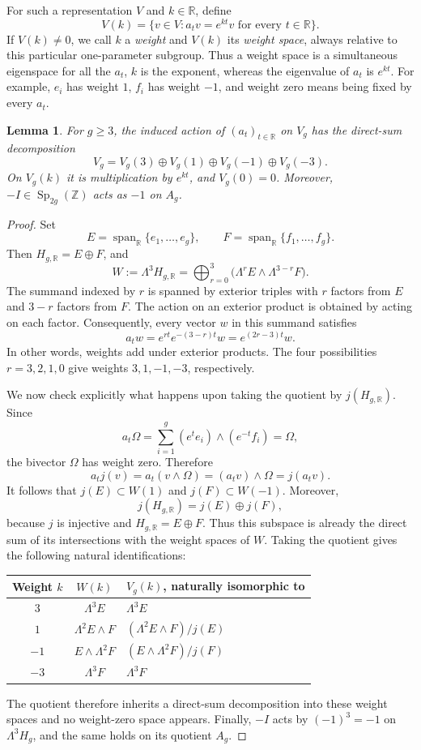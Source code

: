\documentclass[11pt,a4paper]{article}
\newtheorem{lemma}[theorem]{Lemma}
\theoremstyle{definition}
\newcommand{\R}{\mathbb R}
\newcommand{\Z}{\mathbb Z}
\newcommand{\Sp}{\operatorname{Sp}}
\begin{document}
For such a representation \(V\) and \(k\in\R\), define
\[
 V(k)=\{v\in V:a_t v=e^{kt}v\text{ for every }t\in\R\}.
\]
If \(V(k)\ne0\), we call \(k\) a \emph{weight} and \(V(k)\)
its \emph{weight space}, always relative to this particular
one-parameter subgroup. Thus a weight space is a simultaneous
eigenspace for all the \(a_t\),  \(k\) is the exponent, whereas
the eigenvalue of \(a_t\) is \(e^{kt}\). For example, \(e_i\)
has weight \(1\), \(f_i\) has weight \(-1\), and weight zero
means being fixed by every \(a_t\).


\begin{lemma}
\label{lem:weights}
For \(g\ge3\), the induced action of \((a_t)_{t\in\R}\)
on \(V_g\) has the direct-sum decomposition
\[
 V_g=V_g(3)\oplus V_g(1)\oplus V_g(-1)\oplus V_g(-3).
\]
On \(V_g(k)\) it is multiplication by \(e^{kt}\), and
\(V_g(0)=0\). Moreover,
\(-I\in\Sp_{2g}(\Z)\) acts as \(-1\) on \(A_g\).
\end{lemma}
\begin{proof}
Set
\[
 E=\operatorname{span}_\R\{e_1,\ldots,e_g\},\qquad
 F=\operatorname{span}_\R\{f_1,\ldots,f_g\}.
\]
Then \(H_{g,\R}=E\oplus F\), and
\[
 W:=\Lambda^3 H_{g,\R}
 =\bigoplus_{r=0}^3
   \bigl(\Lambda^r E\wedge\Lambda^{3-r}F\bigr).
\]
The summand indexed by \(r\) is spanned by exterior triples
with \(r\) factors from \(E\) and \(3-r\) factors from \(F\).
The action on an exterior product is obtained by acting on
each factor. Consequently, every vector \(w\) in this summand
satisfies
\[
 a_t w=e^{rt}e^{-(3-r)t}w=e^{(2r-3)t}w.
\]
In other words, weights add under exterior products. The four
possibilities \(r=3,2,1,0\) give weights \(3,1,-1,-3\),
respectively.

We now check explicitly what happens upon taking the quotient
by \(j(H_{g,\R})\). Since
\[
 a_t\Omega
 =\sum_{i=1}^g(e^te_i)\wedge(e^{-t}f_i)
 =\Omega,
\]
the bivector \(\Omega\) has weight zero. Therefore
\[
 a_t j(v)=a_t(v\wedge\Omega)
         =(a_t v)\wedge\Omega=j(a_t v).
\]
It follows that \(j(E)\subset W(1)\) and
\(j(F)\subset W(-1)\). Moreover,
\[
 j(H_{g,\R})=j(E)\oplus j(F),
\]
because \(j\) is injective and \(H_{g,\R}=E\oplus F\).
Thus this subspace is already the direct sum of its intersections
with the weight spaces of \(W\). Taking the quotient gives the
following natural identifications:
\begin{center}
\begin{tabular}{ccl}
\toprule
Weight \(k\) & \(W(k)\) & \(V_g(k)\), naturally isomorphic to\\
\midrule
\(3\) & \(\Lambda^3E\) & \(\Lambda^3E\)\\
\(1\) & \(\Lambda^2E\wedge F\) &
  \((\Lambda^2E\wedge F)/j(E)\)\\
\(-1\) & \(E\wedge\Lambda^2F\) &
  \((E\wedge\Lambda^2F)/j(F)\)\\
\(-3\) & \(\Lambda^3F\) & \(\Lambda^3F\)\\
\bottomrule
\end{tabular}
\end{center}
The quotient therefore inherits a direct-sum decomposition into
these weight spaces and no weight-zero space appears.
Finally, \(-I\) acts by \((-1)^3=-1\) on \(\Lambda^3H_g\),
and the same holds on its quotient \(A_g\).
\end{proof}
\end{document}
